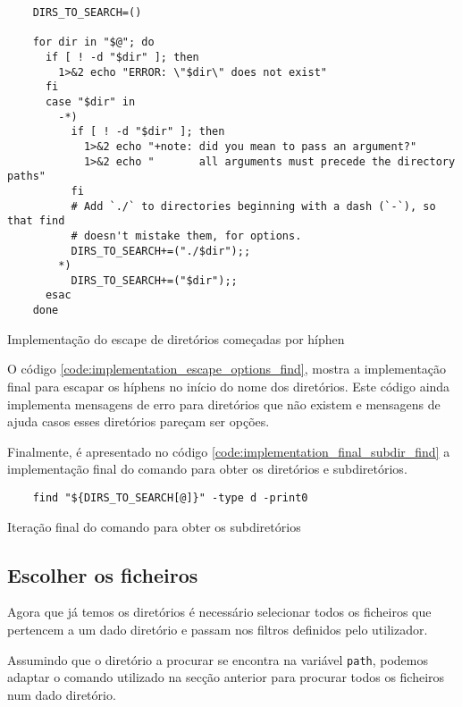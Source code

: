 \begin{listing}[H]
	\centering
	\begin{verbatim}
    DIRS_TO_SEARCH=()

    for dir in "$@"; do
      if [ ! -d "$dir" ]; then
        1>&2 echo "ERROR: \"$dir\" does not exist"
      fi
      case "$dir" in
        -*)
          if [ ! -d "$dir" ]; then
            1>&2 echo "+note: did you mean to pass an argument?"
            1>&2 echo "       all arguments must precede the directory paths"
          fi
          # Add `./` to directories beginning with a dash (`-`), so that find
          # doesn't mistake them, for options.
          DIRS_TO_SEARCH+=("./$dir");;
        *)
          DIRS_TO_SEARCH+=("$dir");;
      esac
    done
  \end{verbatim}
	\caption{Implementação do escape de diretórios começadas por híphen}
	\label{code:implementation_escape_options_find}
\end{listing}

O código \ref{code:implementation_escape_options_find}, mostra a implementação
final para escapar os híphens no início do nome dos diretórios. Este código
ainda implementa mensagens de erro para diretórios que não existem e mensagens
de ajuda casos esses diretórios pareçam ser opções.

Finalmente, é apresentado no código \ref{code:implementation_final_subdir_find}
a implementação final do comando para obter os diretórios e subdiretórios.

\begin{listing}[H]
	\centering
	\begin{verbatim}
    find "${DIRS_TO_SEARCH[@]}" -type d -print0
  \end{verbatim}
	\caption{Iteração final do comando para obter os subdiretórios}
	\label{code:implementation_final_subdir_find}
\end{listing}

\subsection{Escolher os ficheiros}\label{sec:implementation_choosing_files}

Agora que já temos os diretórios é necessário selecionar todos os ficheiros que
pertencem a um dado diretório e passam nos filtros definidos pelo utilizador.

Assumindo que o diretório a procurar se encontra na variável \Verb|path|, podemos
adaptar o comando utilizado na secção anterior para procurar todos os ficheiros
num dado diretório.

